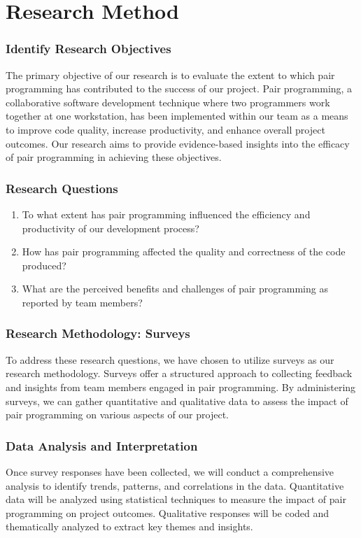 \section{Research Method}
\subsubsection{Identify Research Objectives}
The primary objective of our research is to evaluate the extent to which pair programming has contributed to the success of our project. Pair programming, a collaborative software development technique where two programmers work together at one workstation, has been implemented within our team as a means to improve code quality, increase productivity, and enhance overall project outcomes. Our research aims to provide evidence-based insights into the efficacy of pair programming in achieving these objectives.
\subsubsection{Research Questions}
\begin{enumerate}
    \item To what extent has pair programming influenced the efficiency and productivity of our development process?
    \item How has pair programming affected the quality and correctness of the code produced?
    \item What are the perceived benefits and challenges of pair programming as reported by team members?
\end{enumerate}

\subsubsection{Research Methodology: Surveys}
To address these research questions, we have chosen to utilize surveys as our research methodology. Surveys offer a structured approach to collecting feedback and insights from team members engaged in pair programming. By administering surveys, we can gather quantitative and qualitative data to assess the impact of pair programming on various aspects of our project.
 
\subsubsection{Data Analysis and Interpretation}
Once survey responses have been collected, we will conduct a comprehensive analysis to identify trends, patterns, and correlations in the data. Quantitative data will be analyzed using statistical techniques to measure the impact of pair programming on project outcomes. Qualitative responses will be coded and thematically analyzed to extract key themes and insights.

